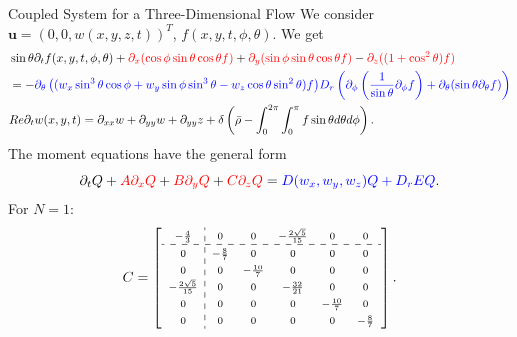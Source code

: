 \begin{frame}{Coupled System for a Three-Dimensional Flow}
	\scriptsize
	We consider $\boldsymbol{u} = \left( 0, 0, w(x,y,z,t)\right)^T$, $f(x,y,t,\phi,\theta)$. We get
	\begin{equation}
		\begin{aligned}
			&\sin\theta \partial_{t}f(x,y,t,\phi, \theta)+ \textcolor{red}{\partial_x(\cos\phi \sin\theta \cos\theta f)} + \textcolor{red}{\partial_y(\sin \phi \sin \theta \cos \theta f)} - \textcolor{red}{\partial_z((1+ \cos^2 \theta)f)} \\
			&= -  \textcolor{blue}{\partial_\theta\left(( w_x \sin^3 \theta \cos \phi + w_y\sin \phi \sin^3 \theta - w_z \cos \theta \sin^2 \theta) f\right)} \textcolor{blue}{D_{r}\left( \partial_\phi \left(\frac{1}{\sin \theta} \partial_\phi f \right)+ \partial_\theta (\sin \theta \partial_\theta f)\right)} \\
			&Re\partial_{t}w(x,y,t) = \partial_{xx}w + \partial_{yy}w + \partial_{yy}z + \delta\left(\bar{\rho}-\int_{0}^{2\pi} \int_{0}^{\pi} f \sin \theta d\theta d\phi \right).
		\end{aligned}
	\end{equation}
	\pause
	The moment equations have the general form
	\begin{equation}
		\partial_t Q + \textcolor{red}{A  \partial_x Q}
		+ \textcolor{red}{B \partial_y Q} +  \textcolor{red}{C \partial_z Q} =  \textcolor{blue}{ D(w_x,w_y, w_z)Q+ D_rEQ}.
	\end{equation}
For $N=1$:
\[
\scriptsize
\renewcommand{\arraystretch}{1.5} 
C = \left[
\begin{array}{c:ccccc}
	-\frac{4}{3} & 0 & 0 & -\frac{2\sqrt{5}}{15} & 0 & 0 \\
	\hdashline        
	0 & -\frac{8}{7} & 0 & 0 & 0 & 0 \\
	0 & 0 & -\frac{10}{7} & 0 & 0 & 0 \\
	-\frac{2\sqrt{5}}{15} & 0 & 0 & -\frac{32}{21} & 0 & 0 \\
	0 & 0 & 0 & 0 & -\frac{10}{7} & 0\\
	0 & 0 & 0 & 0 & 0 & -\frac{8}{7}
\end{array}
\right].
\]
\end{frame}








